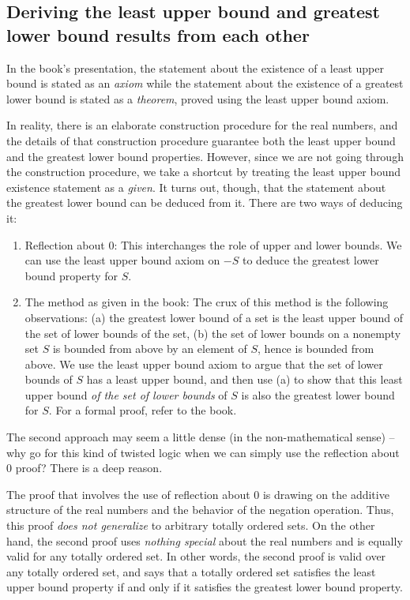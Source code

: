 \documentclass{amsart}
\begin{document}
\subsection{Deriving the least upper bound and greatest lower bound results from each other}

In the book's presentation, the statement about the existence of a
least upper bound is stated as an {\em axiom} while the statement
about the existence of a greatest lower bound is stated as a {\em
theorem}, proved using the least upper bound axiom.

In reality, there is an elaborate construction procedure for the real
numbers, and the details of that construction procedure guarantee both
the least upper bound and the greatest lower bound
properties. However, since we are not going through the construction
procedure, we take a shortcut by treating the least upper bound
existence statement as a {\em given}. It turns out, though, that the
statement about the greatest lower bound can be deduced from it. There
are two ways of deducing it:

\begin{enumerate}
\item Reflection about $0$: This interchanges the role of upper and
  lower bounds. We can use the least upper bound axiom on $-S$ to
  deduce the greatest lower bound property for $S$.
\item The method as given in the book: The crux of this method is the
  following observations: (a) the greatest lower bound of a set is the
  least upper bound of the set of lower bounds of the set, (b) the set
  of lower bounds on a nonempty set $S$ is bounded from above by an
  element of $S$, hence is bounded from above. We use the least upper
  bound axiom to argue that the set of lower bounds of $S$ has a least
  upper bound, and then use (a) to show that this least upper bound
  {\em of the set of lower bounds} of $S$ is also the greatest lower
  bound for $S$. For a formal proof, refer to the book.
\end{enumerate}

The second approach may seem a little dense (in the non-mathematical
sense) -- why go for this kind of twisted logic when we can simply use
the reflection about $0$ proof?  There is a deep reason.

The proof that involves the use of reflection about $0$ is drawing on
the additive structure of the real numbers and the behavior of the
negation operation. Thus, this proof {\em does not generalize} to
arbitrary totally ordered sets. On the other hand, the second proof
uses {\em nothing special} about the real numbers and is equally valid
for any totally ordered set. In other words, the second proof is valid
over any totally ordered set, and says that a totally ordered set
satisfies the least upper bound property if and only if it satisfies
the greatest lower bound property.
\end{document}
